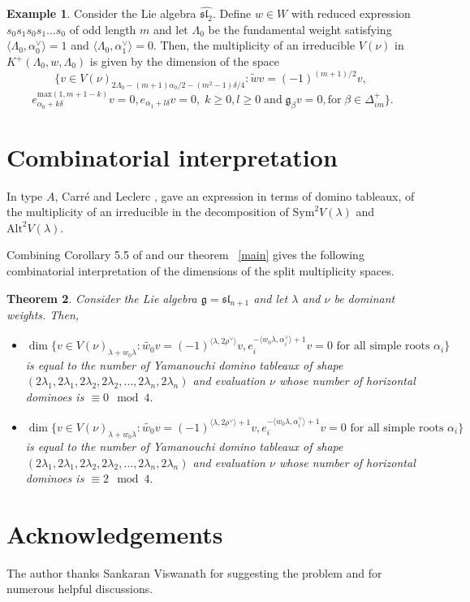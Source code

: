\documentclass[12pt,reqno]{amsart}
\theoremstyle{plain}
\newtheorem{theorem}{Theorem}[section]
\theoremstyle{definition}
\newtheorem{example}[theorem]{Example}
\theoremstyle{plain}
\newcommand{\lie}{\mathfrak}
\begin{document}
\begin{example}
Consider the Lie algebra $\widehat{\lie{sl}_2}.$ Define $w\in W$ with reduced expression $s_0s_1s_0s_1\ldots s_0$ of odd length $m$ and let $\Lambda_0$ be the fundamental weight satisfying $\langle\Lambda_0, \alpha_0^\vee\rangle=1$ and $\langle\Lambda_0, \alpha_1^\vee\rangle=0.$ Then, the multiplicity of an irreducible $V(\nu)$ in $K^+(\Lambda_0,w,\Lambda_0)$ is given by the dimension of the space 
    $$\bigl \{v\in V(\nu)_{2\Lambda_0-(m+1)\alpha_0/2-(m^2-1)\delta/4}:\widetilde{w}v=(-1)^{(m+1)/2}v,$$
    $$\; e_{\alpha_0+k\delta}^{\text{max}(1,m+1-k)}v = 0, e_{\alpha_1+l\delta}v = 0,\;k\ge 0, l\ge0\; \text{and}\; \lie g_\beta v=0, \text{for}\; \beta \in \Delta_{im}^+\bigr\}.$$
\end{example}

\section{Combinatorial interpretation}
In type $A$, Carr{\'e} and Leclerc \cite{CL}, gave an expression in terms of domino tableaux, of the multiplicity of an irreducible in the decomposition of $\text{Sym}^2V(\lambda)$ and $\text{Alt}^2V(\lambda)$. 

Combining Corollary 5.5 of \cite{CL} and our theorem ~\ref{main} gives the following combinatorial interpretation of the dimensions of the split multiplicity spaces.

\begin{theorem}
Consider the Lie algebra $\lie g=\lie{sl}_{n+1}$ and let $\lambda$ and $\nu$ be dominant weights. Then,
\begin{itemize}

   \item[a)] $\dim \{v \in V(\nu)_{\lambda+w_0\lambda}: \widetilde{w_0}v= (-1)^{\langle \lambda, 2\rho^\vee\rangle}v,  e_{i}^{-\langle w_0\lambda, \alpha_i^\vee \rangle + 1} v =0 \text{ for all simple roots } \alpha_i \}$ is equal to the number of Yamanouchi domino tableaux of shape \\ $(2\lambda_1,2\lambda_1, 2\lambda_2,2\lambda_2,\ldots,2\lambda_n,2\lambda_n)$ and evaluation $\nu$ whose number of horizontal dominoes is $\equiv0\mod 4.$
   \item [b)] $\dim \{v \in V(\nu)_{\lambda+w_0\lambda}: \widetilde{w_0}v= (-1)^{\langle \lambda, 2\rho^\vee\rangle+1}v,  e_{i}^{-\langle w_0\lambda, \alpha_i^\vee \rangle + 1} v =0 \text{ for all simple roots } \alpha_i\}$ is equal to the number of Yamanouchi domino tableaux of shape \\ $(2\lambda_1,2\lambda_1, 2\lambda_2,2\lambda_2,\ldots,2\lambda_n,2\lambda_n)$ and evaluation $\nu$ whose number of horizontal dominoes is $\equiv2\mod 4.$
   \end{itemize}
\end{theorem}

\section{Acknowledgements}
The author thanks Sankaran Viswanath for suggesting the problem and for numerous helpful discussions. 

\printbibliography
\end{document}
